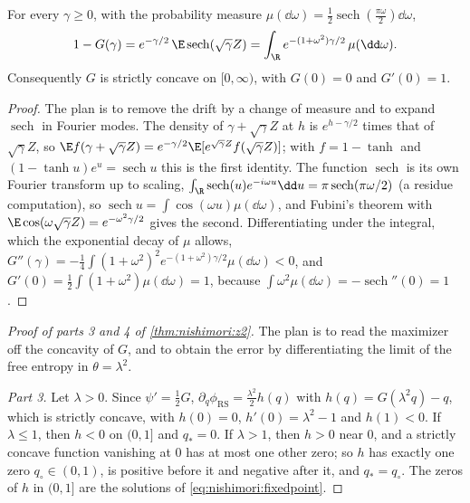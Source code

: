 \begin{refsection}
\begin{lemma}\label{lem:nishimori:cm}
For every $\gamma\ge0$, with the probability measure $\mu(\dd\omega)=\frac12\operatorname{sech}(\frac{\pi\omega}2)\dd\omega$,
\[
1-G(\gamma)=e^{-\gamma/2}\,\E\operatorname{sech}(\sqrt\gamma Z)=\int_\R e^{-(1+\omega^2)\gamma/2}\,\mu(\dd\omega).
\]
Consequently $G$ is strictly concave on $[0,\infty)$, with $G(0)=0$ and $G'(0)=1$.
\end{lemma}

\begin{proof}
The plan is to remove the drift by a change of measure and to expand $\operatorname{sech}$ in Fourier modes. The density of $\gamma+\sqrt\gamma Z$ at $h$ is $e^{h-\gamma/2}$ times that of $\sqrt\gamma Z$, so $\E f(\gamma+\sqrt\gamma Z)=e^{-\gamma/2}\E[e^{\sqrt\gamma Z}f(\sqrt\gamma Z)]$; with $f=1-\tanh$ and $(1-\tanh u)e^u=\operatorname{sech}u$ this is the first identity. The function $\operatorname{sech}$ is its own Fourier transform up to scaling, $\int_\R\operatorname{sech}(u)e^{-i\omega u}\dd u=\pi\operatorname{sech}(\pi\omega/2)$ (a residue computation), so $\operatorname{sech}u=\int\cos(\omega u)\mu(\dd\omega)$, and Fubini's theorem with $\E\cos(\omega\sqrt\gamma Z)=e^{-\omega^2\gamma/2}$ gives the second. Differentiating under the integral, which the exponential decay of $\mu$ allows, $G''(\gamma)=-\frac14\int(1+\omega^2)^2e^{-(1+\omega^2)\gamma/2}\mu(\dd\omega)<0$, and $G'(0)=\frac12\int(1+\omega^2)\mu(\dd\omega)=1$, because $\int\omega^2\mu(\dd\omega)=-\operatorname{sech}''(0)=1$.
\end{proof}

\begin{proof}[Proof of parts 3 and 4 of \cref{thm:nishimori:z2}]
The plan is to read the maximizer off the concavity of $G$, and to obtain the error by differentiating the limit of the free entropy in $\theta=\lambda^2$.

\emph{Part 3.} Let $\lambda>0$. Since $\psi'=\frac12G$, $\partial_q\phi_{\mathrm{RS}}=\frac{\lambda^2}2h(q)$ with $h(q)=G(\lambda^2q)-q$, which is strictly concave, with $h(0)=0$, $h'(0)=\lambda^2-1$ and $h(1)<0$. If $\lambda\le1$, then $h<0$ on $(0,1]$ and $q_*=0$. If $\lambda>1$, then $h>0$ near $0$, and a strictly concave function vanishing at $0$ has at most one other zero; so $h$ has exactly one zero $q_\circ\in(0,1)$, is positive before it and negative after it, and $q_*=q_\circ$. The zeros of $h$ in $(0,1]$ are the solutions of \eqref{eq:nishimori:fixedpoint}.


\end{proof}
\end{refsection}
